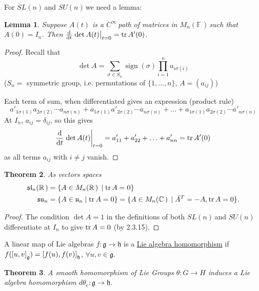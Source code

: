 \documentclass[12pt,a4paper]{article}
\newcommand{\rR}{\ensuremath{\mathbb{R}\,}}
\newcommand{\cC}{\ensuremath{\mathbb{C}\,}}
\newcommand{\fF}{\ensuremath{\mathbb{F}\,}}
\newcommand{\cinf}{\ensuremath{C^{\infty}\,}}
\newcommand{\dgq}[2]{\ensuremath{d {#1}_{#2}}}
\newcommand{\mnr}{\ensuremath{M_n(\rR)\,}}
\newcommand{\mnc}{\ensuremath{M_n(\cC)\,}}
\newcommand{\mnf}{\ensuremath{M_n(\fF)\,}}
\newcommand{\gsun}{\ensuremath{SU(n)\,}}
\newcommand{\gsln}{\ensuremath{SL(n)\,}}
\newcommand{\lgslnr}{\ensuremath{\mathfrak{sl}_n(\rR)}}
\newcommand{\lgun}{\ensuremath{\mathfrak{u}_n}}
\newcommand{\lgsun}{\ensuremath{\mathfrak{su}_n}}
\newcommand{\ul}[1]{\underline{#1}}
\newcommand{\commg}[2]{\ensuremath{\comm{#1}{#2}}_{\mathfrak{g}}}
\newcommand{\comml}[3]{\ensuremath{\comm{#1}{#2}}_{\mathfrak{#3}}}
\newtheorem{thm}{Theorem}[subsubsection]
\newtheorem{lemma}[thm]{Lemma}
\begin{document}
For \gsln and \gsun we need a lemma:

\begin{lemma}
Suppose $A(t)$ is a \cinf path of matrices in \mnf such that $A(0)=I_n$. Then $\dv{t}\eval{\det A(t)}_{t=0}=\tr A'(0)$.
\end{lemma}

\begin{proof}
Recall that 
\[\det A = \sum_{\sigma\in S_n} \operatorname{sign}(\sigma) \prod_{i=1}^n a_{i \sigma(i)} \]
($S_n=$ symmetric group, i.e. permutations of $\{1,\ldots,n\}$, $A=(a_{ij})$)

Each term of sum, when differentiated gives an expression (product rule)
\[a'_{1\sigma(1)}a_{2\sigma(2)}\cdots a_{n\sigma(n)}+a_{1\sigma(1)}a'_{2\sigma(2)}\cdots a_{n\sigma(n)}+\ldots +a_{1\sigma(1)}a_{2\sigma(2)}\cdots a'_{n\sigma(n)}\]
At $I_n$, $a_{ij}=\delta_{ij}$, so this gives 
\[\dv{t}\eval{\det A(t)}_{t=0}=a'_{11}+a'_{22}+\ldots +a'_{nn} =\tr A'(0) \]
as all terms $a_{ij}$ with $i\neq j$ vanish. 
\end{proof}

\begin{thm}
As vectors spaces 
\begin{align*}
\lgslnr & =\{A\in \mnr \mid \tr A=0\}\\
\lgsun & =\{A\in \lgun \mid \tr A=0\}=\{A\in\mnc \mid \bar{A}^T=-A, \tr A=0\}.
\end{align*}
\end{thm}

\begin{proof}
The condition $\det A=1$ in the definitions of both \gsln and \gsun differentiate at $I_n$ to give $\tr A=0$ (by 2.3.15).
\end{proof}

A linear map of Lie algebras $f:\mathfrak{g}\to \mathfrak{h}$ is a \ul{Lie algebra homomorphism} if $f(\commg{u}{v})=\comml{f(u)}{f(v)}{h}$, $\forall u,v \in \mathfrak{g}$.

\begin{thm}
A smooth homomorphism of Lie Groups $\theta:G\to H$ induces a Lie algebra homomorphism $\dgq{\theta}{e}:\mathfrak{g}\to \mathfrak{h}$.
\end{thm}
\end{document}
